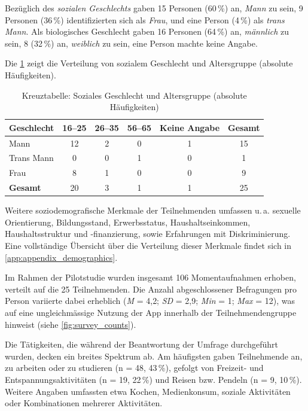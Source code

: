 Bezüglich des \emph{sozialen Geschlechts} gaben 15 Personen (60\,\%) an, \emph{Mann} zu sein, 9 Personen (36\,\%) identifizierten sich als \emph{Frau}, und eine Person (4\,\%) als \emph{trans Mann}. Als biologisches Geschlecht gaben 16 Personen (64\,\%) an, \emph{männlich} zu sein, 8 (32\,\%) an, \emph{weiblich} zu sein, eine Person machte keine Angabe.

Die \cref{tab:kreuztabelle_abs} zeigt die Verteilung von sozialem Geschlecht und Altersgruppe (absolute Häufigkeiten).

\begin{table}[H]
    \centering
    \caption{Kreuztabelle: Soziales Geschlecht und Altersgruppe (absolute Häufigkeiten)}
    \label{tab:kreuztabelle_abs}
    \begin{tabular}{lccccc}
    \toprule
    \textbf{Geschlecht} & 16--25 & 26--35 & 56--65 & Keine Angabe & Gesamt \\
    \midrule
    Mann       & 12 & 2 & 0 & 1 & 15 \\
    Trans Mann &  0 & 0 & 1 & 0 & 1  \\
    Frau       &  8 & 1 & 0 & 0 & 9  \\
    \midrule
    \textbf{Gesamt} & 20 & 3 & 1 & 1 & 25 \\
    \bottomrule
    \end{tabular}
\end{table}

Weitere soziodemografische Merkmale der Teilnehmenden umfassen u.\,a. sexuelle Orientierung, Bildungsstand, Erwerbsstatus, Haushaltseinkommen, Haushaltsstruktur und -finanzierung, sowie Erfahrungen mit Diskriminierung. Eine vollständige Übersicht über die Verteilung dieser Merkmale findet sich in \cref{app:appendix_demographics}.

Im Rahmen der Pilotstudie wurden insgesamt 106 Momentaufnahmen erhoben, verteilt auf die 25 Teilnehmenden. Die Anzahl abgeschlossener Befragungen pro Person variierte dabei erheblich (\textit{M} = 4{,}2; \textit{SD} = 2{,}9; \textit{Min} = 1; \textit{Max} = 12), was auf eine ungleichmässige Nutzung der App innerhalb der Teilnehmendengruppe hinweist (siehe \cref{fig:survey_counts}).

Die Tätigkeiten, die während der Beantwortung der Umfrage durchgeführt wurden, decken ein breites Spektrum ab. Am häufigsten gaben Teilnehmende an, zu arbeiten oder zu studieren (n = 48, 43\,\%), gefolgt von Freizeit- und Entspannungsaktivitäten (n = 19, 22\,\%) und Reisen bzw. Pendeln (n = 9, 10\,\%). Weitere Angaben umfassten etwa Kochen, Medienkonsum, soziale Aktivitäten oder Kombinationen mehrerer Aktivitäten.

